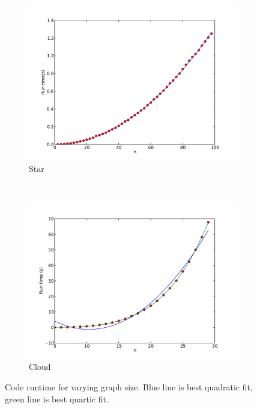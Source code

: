\documentclass{article}
\begin{document}
\begin{figure}
        \centering
        \begin{subfigure}[b]{0.45\textwidth}
                \centering
                \includegraphics[width=\textwidth]{star_time.pdf}
                \caption{Star}
        \end{subfigure}
        ~ 
        \begin{subfigure}[b]{0.45\textwidth}
                \centering
                \includegraphics[width=\textwidth]{cloud_time.pdf}
                \caption{Cloud}
        \end{subfigure}
        \caption{Code runtime for varying graph size. Blue line is best quadratic fit, green line is best quartic fit.}
        \label{fig:time}
\end{figure}
\end{document}
